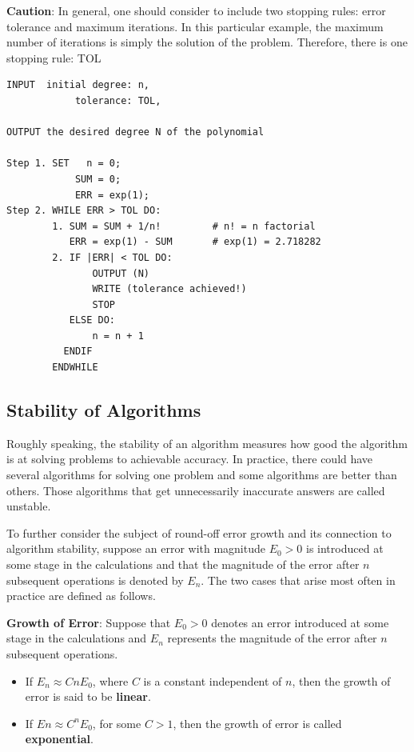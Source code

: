\documentclass[
]{book}
\begin{document}
\textbf{Caution}: In general, one should consider to include two stopping rules: error tolerance and maximum iterations. In this particular example, the maximum number of iterations is simply the solution of the problem. Therefore, there is one stopping rule: TOL

\begin{verbatim}
INPUT  initial degree: n, 
            tolerance: TOL, 
            
OUTPUT the desired degree N of the polynomial

Step 1. SET   n = 0;
            SUM = 0;  
            ERR = exp(1);
Step 2. WHILE ERR > TOL DO:
        1. SUM = SUM + 1/n!         # n! = n factorial
           ERR = exp(1) - SUM       # exp(1) = 2.718282
        2. IF |ERR| < TOL DO:
               OUTPUT (N)
               WRITE (tolerance achieved!)
               STOP
           ELSE DO:
               n = n + 1
          ENDIF
        ENDWHILE
\end{verbatim}

\hfill\break

\hypertarget{stability-of-algorithms}{%
\subsection{Stability of Algorithms}\label{stability-of-algorithms}}

Roughly speaking, the stability of an algorithm measures how good the algorithm is at solving problems to achievable accuracy. In practice, there could have several algorithms for solving one problem and some algorithms are better than others. Those algorithms that get unnecessarily inaccurate answers are called unstable.

To further consider the subject of round-off error growth and its connection to algorithm stability, suppose an error with magnitude \(E_0 > 0\) is introduced at some stage in the calculations and that the magnitude of the error after \(n\) subsequent operations is denoted by \(E_n\). The two cases that arise most often in practice are defined as follows.

\textbf{Growth of Error}: Suppose that \(E_0 > 0\) denotes an error introduced at some stage in the calculations and \(E_n\) represents the magnitude of the error after \(n\) subsequent operations.

\begin{itemize}
\item
  If \(E_n \approx CnE_0\), where \(C\) is a constant independent of \(n\), then the growth of error is said to be \textbf{linear}.
\item
  If \(En \approx C^nE_0\), for some \(C > 1\), then the growth of error is called \textbf{exponential}.
\end{itemize}
\end{document}
